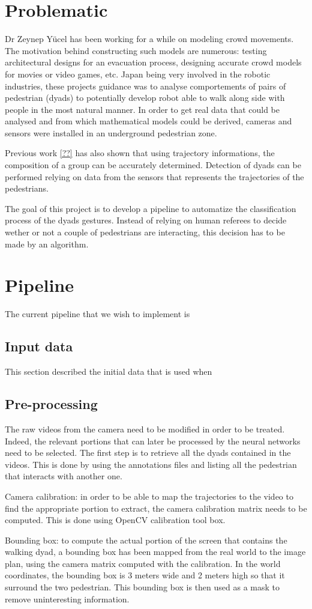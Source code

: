 \documentclass[12pt,a4paper,twoside]{article}
\begin{document}
\section{Problematic}

Dr Zeynep Yücel has been working for a while on modeling crowd movements. The motivation behind constructing such models are numerous: testing architectural designs for an evacuation process, designing accurate crowd models for movies or video games, etc. Japan being very involved in the robotic industries, these projects guidance was to analyse comportements of pairs of pedestrian (dyads) to potentially develop robot able to walk along side with people in the most natural manner. In order to get real data that could be analysed and from which mathematical models could be derived, cameras and sensors were installed in an underground pedestrian zone. 

Previous work \ref{??} has also shown that using trajectory informations, the composition of a group can be accurately determined. Detection of dyads can be performed relying on data from the sensors that represents the trajectories of the pedestrians.

The goal of this project is to develop a pipeline to automatize the classification process of the dyads gestures. Instead of relying on human referees to decide wether or not a couple of pedestrians are interacting, this decision has to be made by an algorithm.

\section{Pipeline}

The current pipeline that we wish to implement is 

\subsection{Input data}
This section described the initial data that is used when 

\subsection{Pre-processing}
The raw videos from the camera need to be modified in order to be treated. Indeed, the relevant portions that can later be processed by the neural networks need to be selected. The first step is to retrieve all the dyads contained in the videos. This is done by using the annotations files and listing all the pedestrian that interacts with another one.

Camera calibration: in order to be able to map the trajectories to the video to find the appropriate portion to extract, the camera calibration matrix needs to be computed. This is done using OpenCV calibration tool box. 

Bounding box: to compute the actual portion of the screen that contains the walking dyad, a bounding box has been mapped from the real world to the image plan, using the camera matrix computed with the calibration. In the world coordinates, the bounding box is 3 meters wide and 2 meters high so that it surround the two pedestrian. This bounding box is then used as a mask to remove uninteresting information.
\end{document}
